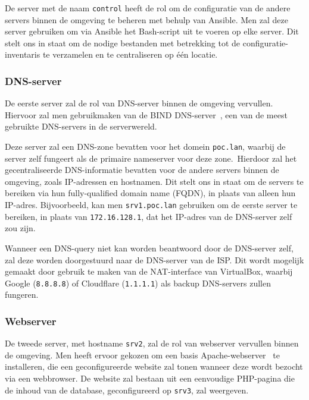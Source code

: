 De server met de naam \texttt{control} heeft de rol om de configuratie van de andere servers binnen de omgeving te beheren met behulp van Ansible.
Men zal deze server gebruiken om via Ansible het Bash-script uit te voeren op elke server.
Dit stelt ons in staat om de nodige bestanden met betrekking tot de configuratie-inventaris te verzamelen en te centraliseren op \'e\'en locatie.

\subsubsection{DNS-server}
\label{poc_dns_server}

De eerste server zal de rol van DNS-server binnen de omgeving vervullen.
Hiervoor zal men gebruikmaken van de BIND DNS-server~\autocite{bind-home}, een van de meest gebruikte DNS-servers in de serverwereld.

Deze server zal een DNS-zone bevatten voor het domein \texttt{poc.lan}, waarbij de server zelf fungeert als de primaire nameserver voor deze zone.\
Hierdoor zal het gecentraliseerde DNS-informatie bevatten voor de andere servers binnen de omgeving, zoals IP-adressen en hostnamen.
Dit stelt ons in staat om de servers te bereiken via hun fully-qualified domain name (FQDN), in plaats van alleen hun IP-adres.
Bijvoorbeeld, kan men \texttt{srv1.poc.lan} gebruiken om de eerste server te bereiken, in plaats van \texttt{172.16.128.1}, dat het IP-adres van de DNS-server zelf zou zijn.

Wanneer een DNS-query niet kan worden beantwoord door de DNS-server zelf, zal deze worden doorgestuurd naar de DNS-server van de ISP.
Dit wordt mogelijk gemaakt door gebruik te maken van de NAT-interface van VirtualBox, waarbij Google (\texttt{8.8.8.8}) of Cloudflare (\texttt{1.1.1.1}) als backup DNS-servers zullen fungeren.

\subsubsection{Webserver}
\label{poc_webserver}

De tweede server, met hostname \texttt{srv2}, zal de rol van webserver vervullen binnen de omgeving.
Men heeft ervoor gekozen om een basis Apache-webserver~\autocite{apache-home} te installeren, die een geconfigureerde website zal tonen wanneer deze wordt bezocht via een webbrowser.
De website zal bestaan uit een eenvoudige PHP-pagina die de inhoud van de database, geconfigureerd op \texttt{srv3}, zal weergeven.

